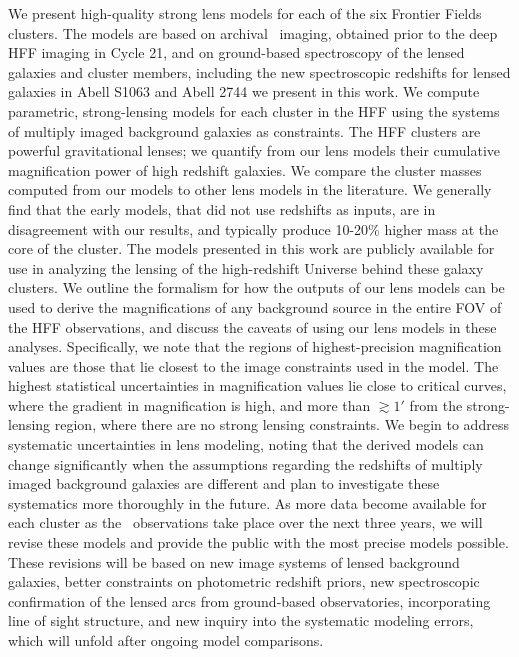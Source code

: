 We present high-quality strong lens models for each of the six Frontier Fields clusters. The models are based on archival \hst\ imaging, obtained prior to the deep HFF imaging in Cycle 21, and on ground-based spectroscopy of the lensed galaxies and cluster members, including the new spectroscopic redshifts for lensed galaxies in Abell S1063 and Abell 2744 we present in this work. We compute parametric, strong-lensing models for each cluster in the HFF using the systems of multiply imaged background galaxies as constraints. The HFF clusters are powerful gravitational lenses; we quantify from our lens models their cumulative magnification power of high redshift galaxies. We compare the cluster masses computed from our models to other lens models in the literature. We generally find that the early models, that did not use redshifts as inputs, are in disagreement with our results, and typically produce 10-20\% higher mass at the core of the cluster. The models presented in this work are publicly available for use in analyzing the lensing of the high-redshift Universe behind these galaxy clusters. We outline the formalism for how the outputs of our lens models can be used to derive the magnifications of any background source in the entire FOV of the HFF observations, and discuss the caveats of using our lens models in these analyses. Specifically, we note that the regions of highest-precision magnification values are those that lie closest to the image constraints used in the model. The highest statistical uncertainties in magnification values lie close to critical curves, where the gradient in magnification is high, and more than $\gtrsim1'$ from the strong-lensing region, where there are no strong lensing constraints. We begin to address systematic uncertainties in lens modeling, noting that the derived models can change significantly when the assumptions regarding the redshifts of multiply imaged background galaxies are different and plan to investigate these systematics more thoroughly in the future. As more data become available for each cluster as the \hst\ observations take place over the next three years, we will revise these models and provide the public with the most precise models possible. These revisions will be based on new image systems of lensed background galaxies, better constraints on photometric redshift priors, new spectroscopic confirmation of the lensed arcs from ground-based observatories, incorporating line of sight structure, and new inquiry into the systematic modeling errors, which will unfold after ongoing model comparisons.

